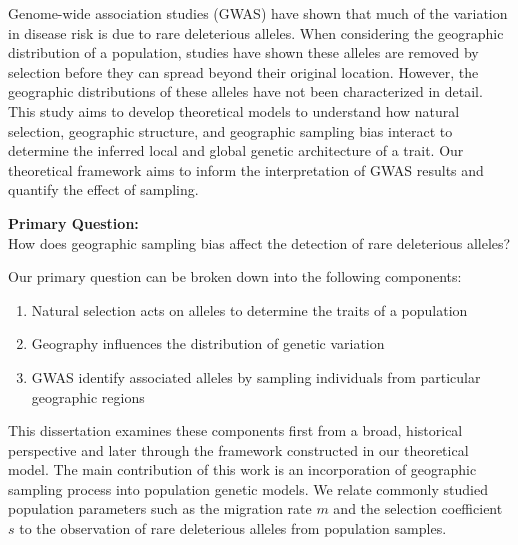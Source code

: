 \abstract
Genome-wide association studies (GWAS) have shown that much of the variation in disease risk is due to rare deleterious alleles. When considering the geographic distribution of a population, studies have shown these alleles are removed by selection before they can spread beyond their original location. However, the geographic distributions of these alleles have not been characterized in detail. This study aims to develop theoretical models to understand how natural selection, geographic structure, and geographic sampling bias interact to determine the inferred local and global genetic architecture of a trait. Our theoretical framework aims to inform the interpretation of GWAS results and quantify the effect of sampling.

\begin{center}
    \textbf{Primary Question:} \\
    How  does geographic sampling bias affect the detection of rare deleterious alleles?
\end{center}


Our primary question can be broken down into the following components:

\begin{enumerate}
    \item Natural selection acts on alleles to determine the traits of a population
    \item Geography influences the distribution of genetic variation 
    \item GWAS identify associated alleles by sampling individuals from particular geographic regions
\end{enumerate}

This dissertation examines these components first from a broad, historical perspective and later through the framework constructed in our theoretical model. The main contribution of this work is an incorporation of geographic sampling process into population genetic models. We relate commonly studied population parameters such as the migration rate $m$ and the selection coefficient $s$ to the observation of rare deleterious alleles from population samples.     
